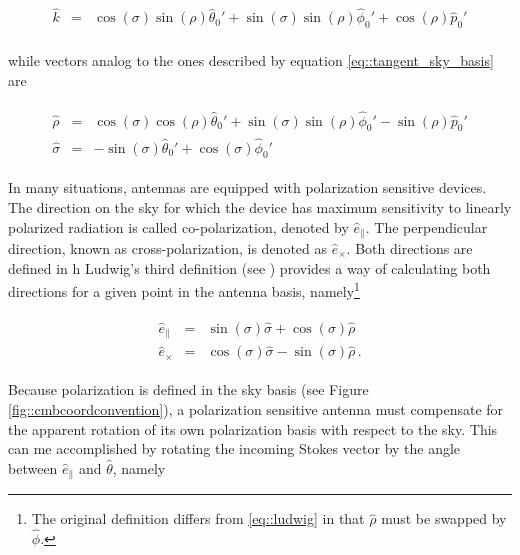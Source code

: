 \documentclass[a4paper,fleqn]{cas-dc}\sloppy
\newcommand{\co}{\mathbin{\|}}
\newcommand{\cx}{\mathbin{\times}}
\begin{document}
	\begin{equation}
	\begin{aligned}
	\hat{k}       &=&  \cos(\sigma)\sin(\rho)\hat{\theta}_0' + \sin(\sigma)\sin(\rho) \hat{\phi}_0' + \cos(\rho) \hat{p}_0' \\
	\end{aligned}
	\end{equation}
	
	\noindent
	while vectors analog to the ones described by equation \ref{eq::tangent_sky_basis} are
	
	\begin{eqnarray}
	\begin{aligned}
	\hat{\rho}    &=&  \cos(\sigma)\cos(\rho)\hat{\theta}_0' + \sin(\sigma)\sin(\rho) \hat{\phi}_0' - \sin(\rho) \hat{p}_0' \\
	\hat{\sigma}  &=& -\sin(\sigma)\hat{\theta}_0' + \cos(\sigma)\hat{\phi}_0'
	\end{aligned}
	\end{eqnarray}
	
	In many situations, antennas are equipped with polarization sensitive devices. The direction on the sky for which the device has maximum sensitivity to linearly polarized radiation is called co-polarization, denoted by $\hat{e}_{\co}$. The perpendicular direction, known as cross-polarization, is denoted as $\hat{e}_{\cx}$.
	Both directions are defined in h Ludwig's third definition (see \cite{1140406}) provides a way of calculating both directions for a given point in the antenna basis, namely\footnote{The original definition differs from \ref{eq::ludwig} in that $\hat{\rho}$ must be swapped by $\hat{\phi}$.}
	
	\begin{eqnarray}
	\begin{aligned}
	\hat{e}_{\co} &=& \sin(\sigma) \hat{\sigma} + \cos(\sigma) \hat{\rho} \\
	\hat{e}_{\cx} &=& \cos(\sigma) \hat{\sigma} - \sin(\sigma) \hat{\rho} \, .
	\end{aligned}
	\label{eq::ludwig}
	\end{eqnarray}
	
	Because polarization is defined in the sky basis (see Figure \ref{fig::cmbcoordconvention}), a polarization sensitive antenna must compensate for the apparent rotation of its own polarization basis with respect to the sky. This can me accomplished by rotating the incoming Stokes vector by the angle between $\hat{e}_{\co}$ and $\hat{\theta}$, namely
	
\end{document}
